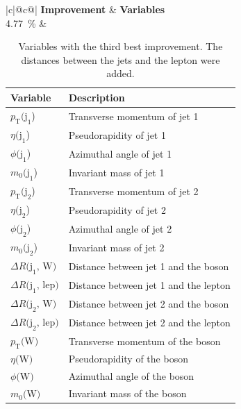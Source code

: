 \begin{table}[h]
    \centering
    \label{tab:app_vars_3}
    \caption{Variables with the third best improvement. The distances between the jets and the lepton were added.}
    \begin{tabular}{ |c|@{}c@{}| }
        \hline
        \textbf{Improvement} & \textbf{Variables}\\
        \hline
        \SI{4.77}{\%} & 
        \begin{tabular}{ll}
            \hline
            Variable & Description\\
            \hline
            $p_\text{T}\text{(j}_\text{1}$) & Transverse momentum of jet 1\\
            $\eta\text{(j}_\text{1}$) & Pseudorapidity of jet 1\\
            $\phi\text{(j}_\text{1}$) & Azimuthal angle of jet 1\\
            $m_0\text{(j}_\text{1}$) & Invariant mass of jet 1\\

            $p_\text{T}\text{(j}_\text{2}$) & Transverse momentum of jet 2\\
            $\eta\text{(j}_\text{2}$) & Pseudorapidity of jet 2\\
            $\phi\text{(j}_\text{2}$) & Azimuthal angle of jet 2\\
            $m_0\text{(j}_\text{2}$) & Invariant mass of jet 2\\

            $\Delta R\text{(j}_\text{1}\text{, W)}$ & Distance between jet 1 and the \PW boson\\
            $\Delta R\text{(j}_\text{1}\text{, lep)}$ & Distance between jet 1 and the lepton\\
            $\Delta R\text{(j}_\text{2}\text{, W)}$ & Distance between jet 2 and the \PW boson\\
            $\Delta R\text{(j}_\text{2}\text{, lep)}$ & Distance between jet 2 and the lepton\\

            $p_\text{T}\text{(W)}$ & Transverse momentum of the \PW boson\\
            $\eta\text{(W)}$ & Pseudorapidity of the \PW boson\\
            $\phi\text{(W)}$ & Azimuthal angle of the \PW boson\\
            $m_0\text{(W)}$ & Invariant mass of the \PW boson\\
            \hline
        \end{tabular}\\
        \hline
    \end{tabular}
\end{table}

